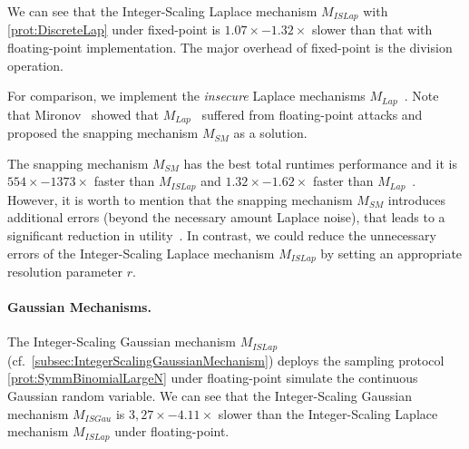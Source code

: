 We can see that the Integer-Scaling Laplace mechanism $M_{ISLap}$ with \autoref{prot:DiscreteLap} under \booleanGMW fixed-point is $1.07\times-1.32\times$ slower than that with \booleanGMW floating-point implementation.
The major overhead of \booleanGMW fixed-point is the division operation.

For comparison, we implement the \textit{insecure} Laplace mechanisms $M_{Lap}$~\cite{eigner2014differentially}.
Note that Mironov~\cite{mironov2012significance} showed that $M_{Lap}$~\cite{eigner2014differentially} suffered from floating-point attacks and proposed the snapping mechanism $M_{SM}$ as a solution.

The snapping mechanism $M_{SM}$ has the best total runtimes performance and it is $554\times-1373\times $ faster than $M_{ISLap}$ and $1.32\times- 1.62\times$ faster than $M_{Lap}$~\cite{eigner2014differentially}.
However, it is worth to mention that the snapping mechanism $M_{SM}$ introduces additional errors (beyond the necessary amount Laplace noise), that leads to a significant reduction in utility~\cite{Covington2019,googleDP2019}.
In contrast, we could reduce the unnecessary errors of the Integer-Scaling Laplace mechanism $M_{ISLap}$ by setting an appropriate resolution parameter $r$.




\paragraph{Gaussian Mechanisms.}
The Integer-Scaling Gaussian mechanism $M_{ISLap}$ (cf.~\autoref{subsec:IntegerScalingGaussianMechanism}) deploys the sampling protocol \autoref{prot:SymmBinomialLargeN} under \booleanGMW floating-point simulate the continuous Gaussian random variable.
We can see that the Integer-Scaling Gaussian mechanism $M_{ISGau}$ is $3,27\times-4.11\times$ slower than the Integer-Scaling Laplace mechanism $M_{ISLap}$ under \booleanGMW floating-point.

